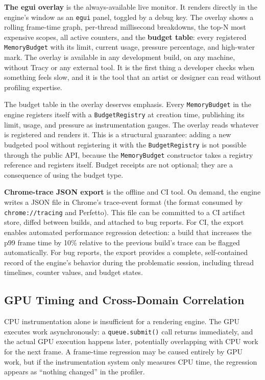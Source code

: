 \documentclass[
  11pt,
  letterpaper,
  DIV=11,
  numbers=noendperiod,
  twoside,
  open=right]{scrreprt}
\begin{document}
\textbf{The egui overlay} is the always-available live monitor. It
renders directly in the engine's window as an \texttt{egui} panel,
toggled by a debug key. The overlay shows a rolling frame-time graph,
per-thread millisecond breakdowns, the top-N most expensive scopes, all
active counters, and the \textbf{budget table}: every registered
\texttt{MemoryBudget} with its limit, current usage, pressure
percentage, and high-water mark. The overlay is available in any
development build, on any machine, without Tracy or any external tool.
It is the first thing a developer checks when something feels slow, and
it is the tool that an artist or designer can read without profiling
expertise.

The budget table in the overlay deserves emphasis. Every
\texttt{MemoryBudget} in the engine registers itself with a
\texttt{BudgetRegistry} at creation time, publishing its limit, usage,
and pressure as instrumentation gauges. The overlay reads whatever is
registered and renders it. This is a structural guarantee: adding a new
budgeted pool without registering it with the \texttt{BudgetRegistry} is
not possible through the public API, because the \texttt{MemoryBudget}
constructor takes a registry reference and registers itself. Budget
receipts are not optional; they are a consequence of using the budget
type.

\textbf{Chrome-trace JSON export} is the offline and CI tool. On demand,
the engine writes a JSON file in Chrome's trace-event format (the format
consumed by \texttt{chrome://tracing} and Perfetto). This file can be
committed to a CI artifact store, diffed between builds, and attached to
bug reports. For CI, the export enables automated performance regression
detection: a build that increases the p99 frame time by 10\% relative to
the previous build's trace can be flagged automatically. For bug
reports, the export provides a complete, self-contained record of the
engine's behavior during the problematic session, including thread
timelines, counter values, and budget states.

\subsection{GPU Timing and Cross-Domain
Correlation}\label{gpu-timing-and-cross-domain-correlation}

CPU instrumentation alone is insufficient for a rendering engine. The
GPU executes work asynchronously: a \texttt{queue.submit()} call returns
immediately, and the actual GPU execution happens later, potentially
overlapping with CPU work for the next frame. A frame-time regression
may be caused entirely by GPU work, but if the instrumentation system
only measures CPU time, the regression appears as ``nothing changed'' in
the profiler.
\end{document}
